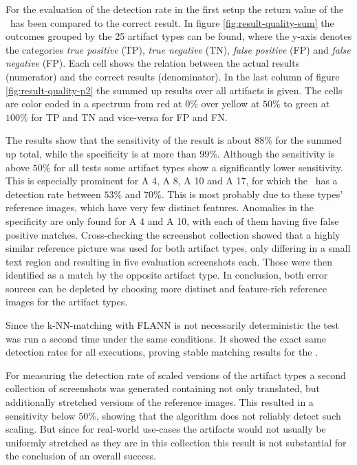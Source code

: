 For the evaluation of the detection rate in the first setup the return value of the \vd~has been compared to the correct result. In figure \ref{fig:result-quality-sum} the outcomes grouped by the 25 artifact types can be found, where the y-axis denotes the categories \emph{true positive} (TP), \emph{true negative} (TN), \emph{false positive} (FP) and \emph{false negative} (FP). Each cell shows the relation between the actual results (numerator) and the correct results (denominator). In the last column of figure \ref{fig:result-quality-p2} the summed up results over all artifacts is given. The cells are color coded in a spectrum from red at $0\%$ over yellow at $50\%$ to green at $100\%$ for TP and TN and vice-versa for FP and FN.

The results show that the sensitivity of the result is about $88\%$ for the summed up total, while the specificity is at more than $99\%$. Although the sensitivity is above $50\%$ for all tests some artifact types show a significantly lower sensitivity. This is especially prominent for A 4, A 8, A 10 and A 17, for which the \vd~has a detection rate between $53\%$ and $70\%$. This is most probably due to these types' reference images, which have very few distinct features. Anomalies in the specificity are only found for A 4 and A 10, with each of them having five false positive matches. Cross-checking the screenshot collection showed that a highly similar reference picture was used for both artifact types, only differing in a small text region and resulting in five evaluation screenshots each. Those were then identified as a match by the opposite artifact type. In conclusion, both error sources can be depleted by choosing more distinct and feature-rich reference images for the artifact types.

Since the k-NN-matching with FLANN is not necessarily deterministic the test was run a second time under the same conditions. It showed the exact same detection rates for all executions, proving stable matching results for the \vd. \cite{flann}

For measuring the detection rate of scaled versions of the artifact types a second collection of screenshots was generated containing not only translated, but additionally stretched versions of the reference images. This resulted in a sensitivity below $50\%$, showing that the algorithm does not reliably detect such scaling. But since for real-world use-cases the artifacts would not usually be uniformly stretched as they are in this collection this result is not substantial for the conclusion of an overall success.

